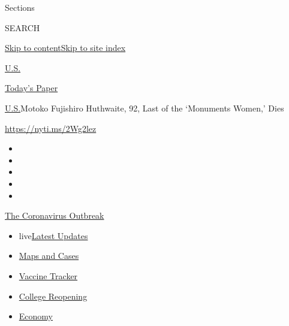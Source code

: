Sections

SEARCH

\protect\hyperlink{site-content}{Skip to
content}\protect\hyperlink{site-index}{Skip to site index}

\href{https://www.nytimes3xbfgragh.onion/section/us}{U.S.}

\href{https://myaccount.nytimes3xbfgragh.onion/auth/login?response_type=cookie\&client_id=vi}{}

\href{https://www.nytimes3xbfgragh.onion/section/todayspaper}{Today's
Paper}

\href{/section/us}{U.S.}\textbar{}Motoko Fujishiro Huthwaite, 92, Last
of the `Monuments Women,' Dies

\url{https://nyti.ms/2Wg2lez}

\begin{itemize}
\item
\item
\item
\item
\item
\end{itemize}

\href{https://www.nytimes3xbfgragh.onion/news-event/coronavirus?action=click\&pgtype=Article\&state=default\&region=TOP_BANNER\&context=storylines_menu}{The
Coronavirus Outbreak}

\begin{itemize}
\tightlist
\item
  live\href{https://www.nytimes3xbfgragh.onion/2020/08/04/world/coronavirus-covid-19.html?action=click\&pgtype=Article\&state=default\&region=TOP_BANNER\&context=storylines_menu}{Latest
  Updates}
\item
  \href{https://www.nytimes3xbfgragh.onion/interactive/2020/us/coronavirus-us-cases.html?action=click\&pgtype=Article\&state=default\&region=TOP_BANNER\&context=storylines_menu}{Maps
  and Cases}
\item
  \href{https://www.nytimes3xbfgragh.onion/interactive/2020/science/coronavirus-vaccine-tracker.html?action=click\&pgtype=Article\&state=default\&region=TOP_BANNER\&context=storylines_menu}{Vaccine
  Tracker}
\item
  \href{https://www.nytimes3xbfgragh.onion/2020/08/02/us/covid-college-reopening.html?action=click\&pgtype=Article\&state=default\&region=TOP_BANNER\&context=storylines_menu}{College
  Reopening}
\item
  \href{https://www.nytimes3xbfgragh.onion/live/2020/08/03/business/stock-market-today-coronavirus?action=click\&pgtype=Article\&state=default\&region=TOP_BANNER\&context=storylines_menu}{Economy}
\end{itemize}

